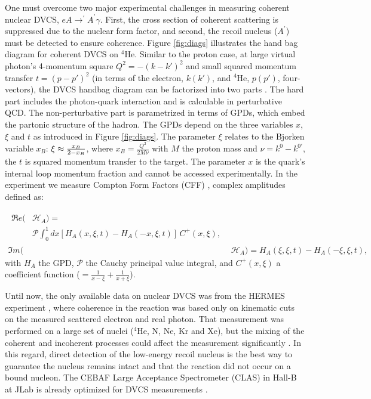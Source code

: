 \documentclass[twocolumn,nofootinbib,showpacs,prl,superscriptaddress,secnumarabic,amssymb,nobibnotes,aps,floatfix]{revtex4}
\begin{document}
One must overcome two major experimental challenges in measuring coherent 
nuclear DVCS, $eA\rightarrow^\prime A^\prime\gamma$. First, the cross section 
of coherent scattering is suppressed due to the nuclear form factor, and 
second, the recoil nucleus ($A^\prime$) must be detected to ensure coherence. 
Figure \ref{fig:diags} 
illustrates the hand bag diagram for coherent DVCS on $^4$He.  Similar to the 
proton case, at large virtual photon's 4-momentum square $Q^2=-(k-k')^{2}$ and 
small squared momentum transfer $t=(p-p')^{2}$ (in terms of the electron, 
$k(k')$, and $^4$He, $p(p')$, four-vectors), the DVCS handbag diagram can be 
factorized into two parts \cite{Freund_Collins,Ji_Osborne}. The hard part 
includes the photon-quark interaction and is calculable in perturbative QCD.  
The non-perturbative part is parametrized in terms of GPDs, which embed the 
partonic structure of the hadron. The GPDs depend on the three variables $x$, 
$\xi$ and $t$ as introduced in Figure \ref{fig:diags}. The parameter $\xi$
relates to the Bjorken variable $x_{B}$: $\xi\approx {{x_B}\over{2-x_B}}$, 
where $x_B=\frac{Q^2}{2M\nu}$ with $M$ the proton mass and  
$\nu=k^0-k^{0\prime}$, the $t$ is squared momentum transfer to the target. The 
parameter $x$ is the quark's internal loop momentum fraction and cannot be 
accessed experimentally. In the experiment we measure Compton Form
Factors (CFF) \cite{Guidal:2013rya}, complex amplitudes defined as:

\begin{align}
\begin{split}
\Re e(&\mathcal{H}_{A}) = \\
    &\mathcal{P} 
\int_{0}^{1}dx[H_A(x,\xi,t)-H_A(-x,\xi,t)] \, C^{+}(x,\xi), 
\end{split} \\
\Im m(&\mathcal{H}_{A}) = H_A(\xi,\xi,t)-H_A(-\xi,\xi,t),
\end{align}
with $H_A$ the GPD, $\mathcal{P}$ 
the Cauchy principal value integral, and $C^{+}(x,\xi)$ a coefficient function 
($=  \frac{1}{x-\xi} + \frac{1}{x+\xi}$).

Until now, the only available data on nuclear DVCS was from the 
HERMES experiment \cite{Ellinghaus:2002zw}, where coherence in the reaction was based only on 
kinematic cuts on the measured scattered electron and real photon. That 
measurement was performed on a large set of nuclei ($^4$He, N, Ne, Kr and Xe), 
but the mixing of the coherent and incoherent processes could affect the
measurement significantly \cite{Guzey:2003jh}. In this regard, direct detection 
of the low-energy recoil nucleus is the best way to guarantee the nucleus 
remains intact and that the reaction did not occur on a bound nucleon. The 
CEBAF Large Acceptance Spectrometer (CLAS) in Hall-B at JLab is already 
optimized for DVCS measurements 
\cite{Girod:2007aa,Gavalian:2009,Seder:2015,Pisano:2015,Jo:2015ema}.
\end{document}
